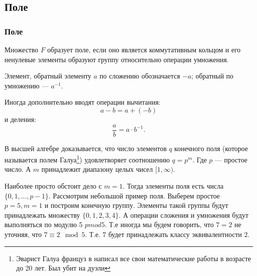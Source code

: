 \subsection{Поле}


\begin{frame}
    \frametitle{Поле}
    
    \begin{definition}
        Множество $F$ образует \alert{поле}, если оно является \alert{коммутативным кольцом} и его ненулевые элементы образуют \alert{группу} относительно операции \alert{умножения}.
    \end{definition}
	
	Элемент, \alert{обратный} элементу $a$ по сложению обозначается $-a$; \alert{обратный} по умножению --- $a^{-1}$.

    Иногда дополнительно вводят операции \alert{вычитания}: \[a-b=a+(-b)\] и \alert{деления}: \[\frac{a}{b}=a\cdot b^{-1}.\]
\end{frame}


В высшей алгебре доказывается, что число элементов $q$ конечного поля (которое называется полем Галуа\footnote{Эварист Галуа француз в написал все свои математические работы в возрасте до 20 лет. Был убит на дуэли}) удовлетворяет соотношению $q = p^m$. Где $p$ --- простое число. А $m$ принадлежит диапазону целых чисел $[1, \infty)$.

Наиболее просто обстоит дело с $m=1$. Тогда элементы поля есть числа $\{0,1,\ldots,p-1\}$. Рассмотрим небольшой пример поля. Выберем простое $p=5, m=1$ и построим конечную группу. Элементы такой группы будут принадлежать множеству $\{0, 1, 2, 3, 4\}$. А операции сложения и умножения будут выполняться по модулю 5 $pmod{5}$. Т.е иногда мы будем говорить, что $7 = 2$ не уточняя, что $7 \equiv 2 \mod{5}$. Т.е. $7$ будет принадлежать классу эквивалентности $2$.


